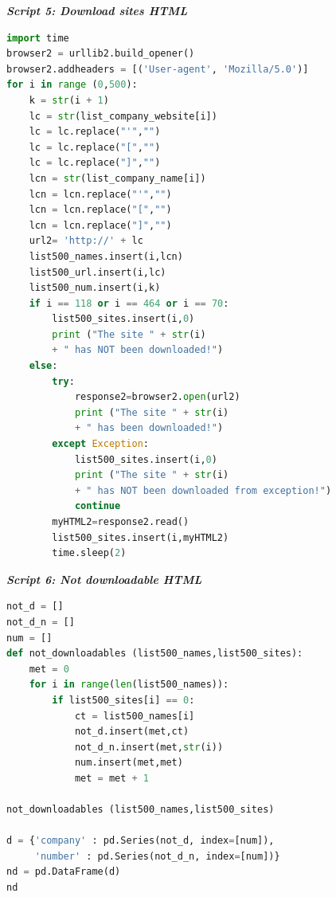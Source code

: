 \documentclass{book}
\begin{document}
\begin{center}
\textit{\textbf{Script 5: Download sites HTML}}\label{p5}
\end{center}
\begin{lstlisting}[language=Python]
import time
browser2 = urllib2.build_opener()
browser2.addheaders = [('User-agent', 'Mozilla/5.0')]
for i in range (0,500):
    k = str(i + 1)
    lc = str(list_company_website[i])
    lc = lc.replace("'","")
    lc = lc.replace("[","")
    lc = lc.replace("]","")
    lcn = str(list_company_name[i])
    lcn = lcn.replace("'","")
    lcn = lcn.replace("[","")
    lcn = lcn.replace("]","")
    url2= 'http://' + lc
    list500_names.insert(i,lcn)
    list500_url.insert(i,lc)
    list500_num.insert(i,k)
    if i == 118 or i == 464 or i == 70:
        list500_sites.insert(i,0)  
        print ("The site " + str(i) 
        + " has NOT been downloaded!")
    else:
        try:
            response2=browser2.open(url2)
            print ("The site " + str(i) 
            + " has been downloaded!")
        except Exception:
            list500_sites.insert(i,0)
            print ("The site " + str(i) 
            + " has NOT been downloaded from exception!")           
            continue 
        myHTML2=response2.read()
        list500_sites.insert(i,myHTML2)        
        time.sleep(2)         
\end{lstlisting}

\begin{center}
\textit{\textbf{Script 6: Not downloadable HTML}}\label{p6}
\end{center}
\begin{lstlisting}[language=Python]
not_d = []
not_d_n = []
num = []
def not_downloadables (list500_names,list500_sites):
    met = 0       
    for i in range(len(list500_names)):       
        if list500_sites[i] == 0:
            ct = list500_names[i]
            not_d.insert(met,ct)
            not_d_n.insert(met,str(i))
            num.insert(met,met)
            met = met + 1

not_downloadables (list500_names,list500_sites)

d = {'company' : pd.Series(not_d, index=[num]),
     'number' : pd.Series(not_d_n, index=[num])}
nd = pd.DataFrame(d)    
nd
\end{lstlisting}
\end{document}
